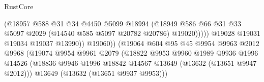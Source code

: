 \begin{lexlean}{RustCore}
\begin{coremodule}
                                                  (@18957
                                                    @588
                                                    @31
                                                    @34
                                                    @4450
                                                    @5099
                                                    @18994
                                                    (@18949
                                                      @586
                                                      @66
                                                      @31
                                                      @33
                                                      @5097
                                                      @2029
                                                      (@14540 @585 @5097 @20782 @20786)
                                                      @19020)))))
                                            @19028
                                            @19031
                                            @19034
                                            @19037
                                            @13990))
                                        @19060))
                                    (@19064
                                      @604
                                      @95
                                      @45
                                      @9954
                                      @9963
                                      @2012
                                      @9968
                                      (@19074
                                        @9954
                                        @9961
                                        @2079
                                        (@18822
                                          @9953
                                          @9960
                                          @1989
                                          @9936
                                          @1996
                                          @14526
                                          (@18836
                                            @9946
                                            @1996
                                            @18842
                                            @14567
                                            @13649
                                            (@13632 (@13651 @9947 @2012)))
                                          @13649
                                          (@13632 (@13651 @9937 @9953)))

\end{coremodule}
\end{lexlean}
